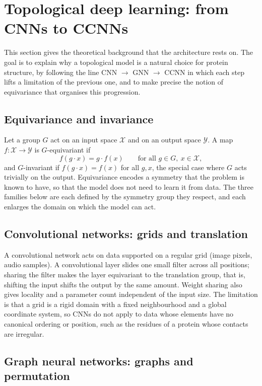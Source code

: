 \documentclass[11pt,a4paper]{article}
\theoremstyle{definition}
\begin{document}
\section{Topological deep learning: from CNNs to CCNNs}

This section gives the theoretical background that the architecture rests on. The
goal is to explain why a topological model is a natural choice for protein
structure, by following the line CNN $\to$ GNN $\to$ CCNN in which each step lifts
a limitation of the previous one, and to make precise the notion of equivariance
that organises this progression.

\subsection{Equivariance and invariance}

Let a group $G$ act on an input space $\mathcal{X}$ and on an output space
$\mathcal{Y}$. A map $f:\mathcal{X}\to\mathcal{Y}$ is $G$-equivariant if
\[
 f(g\cdot x)=g\cdot f(x)\qquad\text{for all }g\in G,\ x\in\mathcal{X},
\]
and $G$-invariant if $f(g\cdot x)=f(x)$ for all $g,x$, the special case where $G$
acts trivially on the output. Equivariance encodes a symmetry that the problem is
known to have, so that the model does not need to learn it from data. The three
families below are each defined by the symmetry group they respect, and each
enlarges the domain on which the model can act.

\subsection{Convolutional networks: grids and translation}

A convolutional network acts on data supported on a regular grid (image pixels,
audio samples). A convolutional layer slides one small filter across all
positions; sharing the filter makes the layer equivariant to the translation
group, that is, shifting the input shifts the output by the same amount. Weight
sharing also gives locality and a parameter count independent of the input size.
The limitation is that a grid is a rigid domain with a fixed neighbourhood and a
global coordinate system, so CNNs do not apply to data whose elements have no
canonical ordering or position, such as the residues of a protein whose contacts
are irregular.

\subsection{Graph neural networks: graphs and permutation}
\end{document}
